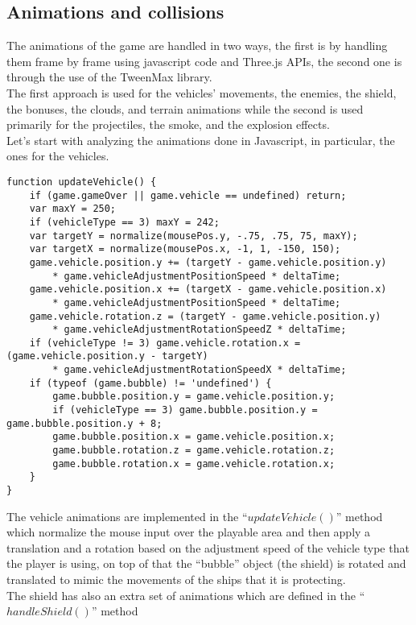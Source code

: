 \documentclass[a4paper,11pt]{article}
\begin{document}
\subsection{Animations and collisions}
The animations of the game are handled in two ways, the first is by handling them frame by frame using javascript code and Three.js APIs, the second one is through the use of the TweenMax library.\\
The first approach is used for the vehicles' movements, the enemies, the shield, the bonuses, the clouds, and terrain animations while the second is used primarily for the projectiles, the smoke, and the explosion effects.\\
Let's start with analyzing the animations done in Javascript, in particular, the ones for the vehicles.\\
\begin{verbatim}
function updateVehicle() {
    if (game.gameOver || game.vehicle == undefined) return;
    var maxY = 250;
    if (vehicleType == 3) maxY = 242;
    var targetY = normalize(mousePos.y, -.75, .75, 75, maxY);
    var targetX = normalize(mousePos.x, -1, 1, -150, 150);
    game.vehicle.position.y += (targetY - game.vehicle.position.y) 
        * game.vehicleAdjustmentPositionSpeed * deltaTime;
    game.vehicle.position.x += (targetX - game.vehicle.position.x) 
        * game.vehicleAdjustmentPositionSpeed * deltaTime;
    game.vehicle.rotation.z = (targetY - game.vehicle.position.y) 
        * game.vehicleAdjustmentRotationSpeedZ * deltaTime;
    if (vehicleType != 3) game.vehicle.rotation.x = (game.vehicle.position.y - targetY) 
        * game.vehicleAdjustmentRotationSpeedX * deltaTime;
    if (typeof (game.bubble) != 'undefined') {
        game.bubble.position.y = game.vehicle.position.y;
        if (vehicleType == 3) game.bubble.position.y = game.bubble.position.y + 8;
        game.bubble.position.x = game.vehicle.position.x;
        game.bubble.rotation.z = game.vehicle.rotation.z;
        game.bubble.rotation.x = game.vehicle.rotation.x;
    }
}
\end{verbatim}
The vehicle animations are implemented in the  ``$updateVehicle()$'' method which normalize the mouse input over the playable area and then apply a translation and a rotation based on the adjustment speed of the vehicle type that the player is using, on top of that the  ``bubble'' object (the shield) is rotated and translated to mimic the movements of the ships that it is protecting.\\
The shield has also an extra set of animations which are defined in the  ``$handleShield()$'' method
\end{document}
